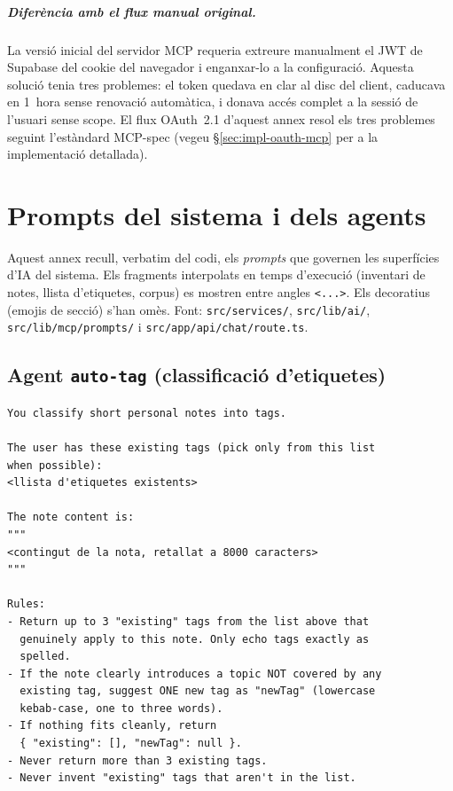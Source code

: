 \paragraph{Diferència amb el flux manual original.} La versió inicial del servidor MCP requeria extreure manualment el JWT de Supabase del cookie del navegador i enganxar-lo a la configuració. Aquesta solució tenia tres problemes: el token quedava en clar al disc del client, caducava en 1~hora sense renovació automàtica, i donava accés complet a la sessió de l'usuari sense scope. El flux OAuth~2.1 d'aquest annex resol els tres problemes seguint l'estàndard MCP-spec (vegeu \S\ref{sec:impl-oauth-mcp} per a la implementació detallada).

\chapter{Prompts del sistema i dels agents}
\label{ch:annex-prompts}

Aquest annex recull, verbatim del codi, els \emph{prompts} que governen
les superfícies d'IA del sistema. Els fragments interpolats en temps
d'execució (inventari de notes, llista d'etiquetes, corpus) es mostren
entre angles \texttt{<...>}. Els decoratius (emojis de secció) s'han
omès. Font: \texttt{src/services/}, \texttt{src/lib/ai/},
\texttt{src/lib/mcp/prompts/} i \texttt{src/app/api/chat/route.ts}.

\section*{Agent \texttt{auto-tag} (classificació d'etiquetes)}

\begin{lstlisting}
You classify short personal notes into tags.

The user has these existing tags (pick only from this list
when possible):
<llista d'etiquetes existents>

The note content is:
"""
<contingut de la nota, retallat a 8000 caracters>
"""

Rules:
- Return up to 3 "existing" tags from the list above that
  genuinely apply to this note. Only echo tags exactly as
  spelled.
- If the note clearly introduces a topic NOT covered by any
  existing tag, suggest ONE new tag as "newTag" (lowercase
  kebab-case, one to three words).
- If nothing fits cleanly, return
  { "existing": [], "newTag": null }.
- Never return more than 3 existing tags.
- Never invent "existing" tags that aren't in the list.
\end{lstlisting}

